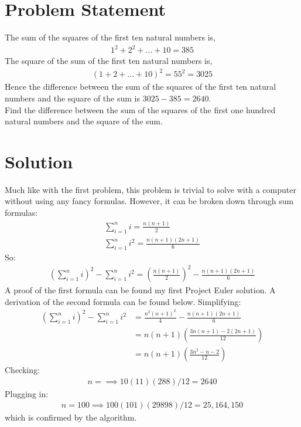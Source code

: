 \documentclass{article}
\begin{document}
\section*{Problem Statement}
The sum of the squares of the first ten natural numbers is,
\begin{gather*}
	1^{2} + 2^{2}+ ... + 10 = 385
\end{gather*}
The square of the sum of the first ten natural numbers is,
\begin{gather*}
	(1 + 2 + ... + 10)^{2} = 55^{2} = 3025
\end{gather*}
Hence the difference between the sum of the squares of the first ten natural numbers and the square of the sum is $3025 - 385 = 2640$.\\[12pt]

\noindent Find the difference between the sum of the squares of the first one hundred natural numbers and the square of the sum.
\section*{Solution}
Much like with the first problem, this problem is trivial to solve with a computer without using any fancy formulas. However, it can be broken down through sum formulas:
\begin{gather*}
	\sum_{i = 1}^{n}i = \frac{n(n + 1)}{2}\\
	\sum_{i = 1}^{n}i^{2} = \frac{n(n + 1)(2n + 1)}{6}
\end{gather*}
So:
\begin{gather*}
\left(\sum_{i = 1}^{n}i\right)^{2} - \sum_{i = 1}^{n}i^{2} = \left(\frac{n(n+1)}{2}\right)^{2} -  \frac{n(n + 1)(2n + 1)}{6}
\end{gather*}
A proof of the first formula can be found my first Project Euler solution. A derivation of the second formula can be found below. Simplifying:
\begin{align*}
	\left(\sum_{i = 1}^{n}i\right)^{2} - \sum_{i = 1}^{n}i^{2} &= \frac{n^{2}(n+1)^{2}}{4} -  \frac{n(n + 1)(2n + 1)}{6}\\
	&= n(n + 1)\left(\frac{3n(n + 1) - 2(2n + 1)}{12}\right)\\
	&= n(n + 1)\left(\frac{3n^{2} - n - 2}{12}\right)
\end{align*}
Checking:
\begin{gather*}
	n = \implies 10(11)(288)/12 = 2640
\end{gather*}
Plugging in:
\begin{gather*}
	n = 100 \implies 100(101)(29898)/12 = 25,164,150
\end{gather*}
which is confirmed by the algorithm.
\end{document}
